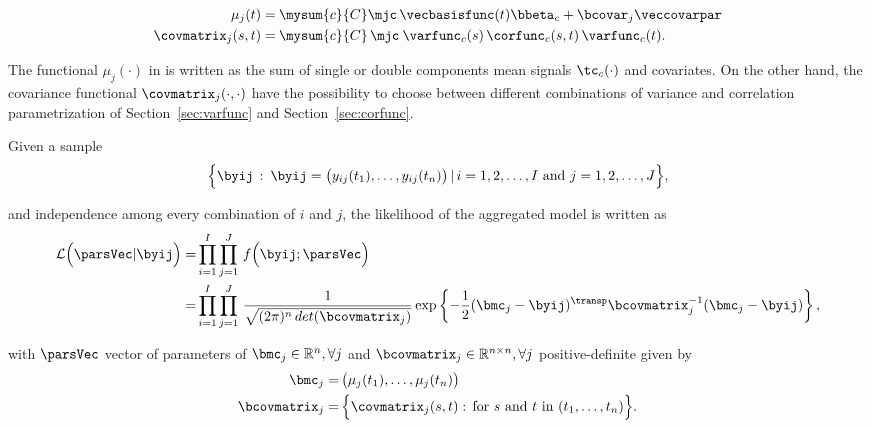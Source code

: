 \begin{align}
  \mu_j(t)
  =&     
     \:
     \mysum{c}{C}
     \mjc \,
     \vecbasisfunc(t) \bbeta_c
      +
      \bcovar_j \veccovarpar \label{eq:muj} \\
  \covmatrix_j(s,t)
  =&\:
  \mysum{c}{C}
  \,
  \mjc
  \:
  \varfunc_c(s) \,
  \corfunc_c(s,t) \,
  \varfunc_c(t).    \label{eq:aggrcov}
\end{align}

The functional $\mu_j(\cdot)$ in  is written as the sum of single or double components mean signals $\tc_c(\cdot)$ and covariates. On the other hand, the covariance functional $\covmatrix_j(\cdot,\cdot)$ have the possibility to choose between different combinations of variance and correlation parametrization of Section~\ref{sec:varfunc} and Section~\ref{sec:corfunc}.

Given a sample
\begin{equation}
  \label{eq:sample}
  \Bigl\{
  \byij \, : \:
  \byij
  =
  \bigl(
    y_{ij}(t_1), \dots, y_{ij}(t_n)
    \bigr)
    \, | \, i=1,2,\dots,I \text{ and }
    j=1,2,\dots,J
  \Bigr\},
\end{equation}

\noindent and independence among every combination of $i$ and $j$, the likelihood of the aggregated model is written as
\begin{align}
  \mathcal{L}
  \Bigl(
    \parsVec | \byij
  \Bigr)
  =&
     \prod_{i=1}^I
     \prod_{j=1}^J
     \,
     f \Bigl( \byij ; \parsVec \Bigr) \\
  =&
     \prod_{i=1}^I
     \prod_{j=1}^J
     \,
     \frac{1}{\sqrt{(2 \pi)^n \, det(\bcovmatrix_j)}}
     \exp
     \left\{
     -\frac{1}{2}
     (\bmc_j - \byij)^\transp
     \bcovmatrix_j^{-1}
     (\bmc_j - \byij)
     \right\},
     \label{eq:aggrmodellikelihood}
\end{align}

\noindent with $\parsVec$ vector of parameters of $\bmc_j \in \mathbb{R}^n, \forall j$ and $\bcovmatrix_j \in \mathbb{R}^{n \times n}, \forall j$ positive-definite given by
\begin{align}
  \bmc_j =&\, \bigl(\mu_j(t_1), \dots, \mu_j(t_n) \bigr)\\
  \bcovmatrix_j
  =& \,
  \Bigl\{
    \covmatrix_j(s,t) : \, \text{for }  s \text{ and } t \text{ in } (t_1, \dots, t_n)
  \Bigr\}.
\end{align}


